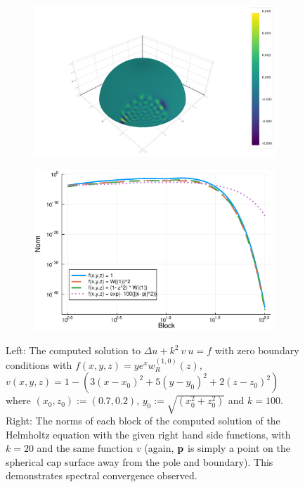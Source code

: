 \documentclass[11pt, oneside]{article}   	%
\newcommand{\genjac}{R}
\newcommand{\genjacw}{w_\genjac}
\begin{document}
\begin{figure}[t]
	\begin{subfigure}{0.5\textwidth}
	\includegraphics[scale=0.25]{helmholtz-f=wyexpx-N=60-n=300}
	\centering
	\end{subfigure}
	\begin{subfigure}{0.5\textwidth}
	\centering
	\includegraphics[scale=0.3]{solutionblocknorms-helmholtz-N=100}
	\end{subfigure}
	\caption{Left: The computed solution to $\Delta u + k^2 \: v \: u = f$ with zero boundary conditions with $f(x,y,z) = y e^x \genjacw^{(1,0)}(z)$, $v(x,y,z) = 1 - (3(x-x_0)^2 + 5(y-y_0)^2 + 2(z-z_0)^2)$ where $(x_0, z_0) := (0.7, 0.2)$, $y_0 := \sqrt{(x_0^2 + z_0^2)}$ and $k = 100$. Right: The norms of each block of the computed solution of the Helmholtz equation with the given right hand side functions, with $k=20$ and the same function $v$ (again, $\bf{p}$ is simply a point on the spherical cap surface away from the pole and boundary). This demonstrates spectral convergence observed.}
	\centering
	\label{fig:helmholtz}
\end{figure}
\end{document}
